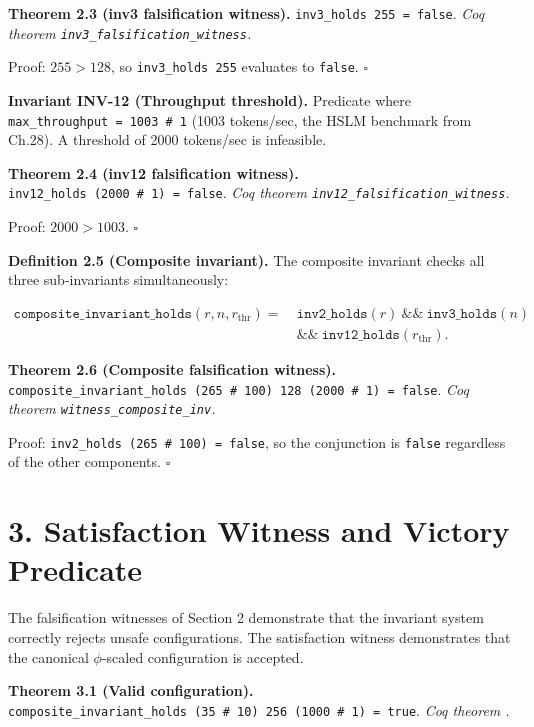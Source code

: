 \textbf{Theorem 2.3 (inv3 falsification witness).}
\texttt{inv3\_holds\ 255\ =\ false}. \emph{Coq
theorem \texttt{inv3\_falsification\_witness}.}

Proof: \(255 > 128\), so \texttt{inv3\_holds\ 255}
evaluates to \texttt{false}. \(\square\)

\textbf{Invariant INV-12 (Throughput threshold).}
Predicate
where \texttt{max\_throughput\ =\ 1003\ \#\ 1}
(1003 tokens/sec, the HSLM benchmark from Ch.28).
A threshold of 2000 tokens/sec is infeasible.

\textbf{Theorem 2.4 (inv12 falsification
witness).}
\texttt{inv12\_holds\ (2000\ \#\ 1)\ =\ false}.
\emph{Coq theorem
\texttt{inv12\_falsification\_witness}.}

Proof: \(2000 > 1003\). \(\square\)

\textbf{Definition 2.5 (Composite invariant).} The
composite invariant checks all three
sub-invariants simultaneously:

\begin{align*}
\texttt{composite\_invariant\_holds}(r, n, r_\text{thr}) =\ &\texttt{inv2\_holds}(r)\ \&\&\ \texttt{inv3\_holds}(n) \\
&\&\&\ \texttt{inv12\_holds}(r_\text{thr}).
\end{align*}

\textbf{Theorem 2.6 (Composite falsification
witness).}
\texttt{composite\_invariant\_holds\ (265\ \#\ 100)\ 128\ (2000\ \#\ 1)\ =\ false}.
\emph{Coq theorem
\texttt{witness\_composite\_inv}.}

Proof:
\texttt{inv2\_holds\ (265\ \#\ 100)\ =\ false}, so
the conjunction is \texttt{false} regardless of
the other components. \(\square\)

\section{3. Satisfaction Witness and Victory
Predicate}\label{fa_22:satisfaction-witness-and-victory-predicate}

The falsification witnesses of Section 2
demonstrate that the invariant system correctly
rejects unsafe configurations. The satisfaction
witness demonstrates that the canonical
\(\phi\)-scaled configuration is accepted.

\textbf{Theorem 3.1 (Valid configuration).}
\texttt{composite\_invariant\_holds\ (35\ \#\ 10)\ 256\ (1000\ \#\ 1)\ =\ true}.
\emph{Coq theorem
.}

